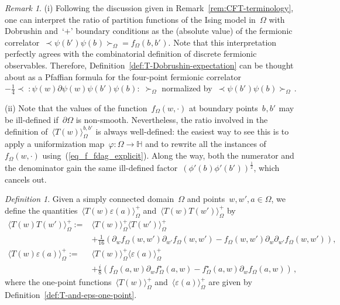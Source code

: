 \documentclass[reqno,11pt,a4paper]{amsart}
\theoremstyle{remark}
\newtheorem{definition}[proposition]{Definition}
\newtheorem{remark}[proposition]{Remark}
\renewcommand{\H}{\mathbb{H}}
\newcommand{\dob}{{b,b'}}
\newcommand{\f}{f_{\Omega}}
\newcommand{\fstar}{f_{\Omega}^\star}
\newcommand\Corr[1]{\langle #1 \rangle}
\newcommand\CorrO[2][+]{\Corr{#2}_\Omega^{#1}}
\newcommand\CorrFerm[2]{\prec\! #2 \!\succ_{#1}{}}
\begin{document}
\begin{remark} \label{rem:T-Dobrusin}
(i) Following the discussion given in Remark~\ref{rem:CFT-terminology}, one can interpret the ratio of partition functions of the Ising model in~$\Omega$ with Dobrushin and~`$+$' boundary conditions as the (absolute value) of the fermionic correlator~$\CorrFerm\Omega{\psi(b'_{})\psi(b_{})} = \f(b_{},b'_{})$. Note that this interpretation perfectly agrees with the combinatorial definition of discrete fermionic observables. Therefore, Definition~\ref{def:T-Dobrushin-expectation} can be thought about as a Pfaffian formula for the four-point fermionic correlator~$-\frac{1}{4}\CorrFerm\Omega{\;:\!\psi(w)\partial\psi(w)\psi(b'_{})\psi(b_{})\!:\;}$ normalized by~$\CorrFerm\Omega{\psi(b'_{})\psi(b_{})}$\,.

\noindent (ii) Note that the values of the function~$\f(w,\cdot)$ at boundary points~$b_{},b'_{}$ may be ill-defined if~$\partial\Omega$ is non-smooth. Nevertheless, the ratio involved in the definition of~$\CorrO[\dob]{T(w)}$ is always well-defined: the easiest way to see this is to apply a uniformization map~$\varphi:\Omega\to\H$ and to rewrite all the instances of~$\f(w,\cdot)$ using~(\ref{eq_f_fdag_explicit}). Along the way, both the numerator and the denominator gain the same ill-defined factor~$(\phi'(b_{})\phi'(b'_{}))^{\frac{1}{2}}$, which cancels out.
\end{remark}

\begin{definition}\label{def:TT-and-Te-correlations}
Given a simply connected domain~$\Omega$ and points~$w,w',a\in\Omega$, we define the quantities~$\CorrO{T(w)\varepsilon(a)}$ and~$\CorrO{T(w)T(w')}$ by
\begin{align*}
\langle T (w) T (w')\rangle^+_\Omega := & \langle T (w) \rangle^+_\Omega  \langle T(w') \rangle^+_\Omega\\
& + {\textstyle \frac{1}{16}}( \partial_w \f (w,w')\partial_{w'} \f (w,w') \!-\! \f (w,w')\partial_w \partial_{w'} \f (w,w')), \\
\langle T (w) \varepsilon (a) \rangle^+_\Omega := & \langle T (w) \rangle^+_\Omega \langle \varepsilon (a) \rangle^+_\Omega\\
& + \textstyle{\frac{i}{8}}(\f(a,w)\partial_w \fstar (a,w)
 - \fstar(a,w)\partial_w \f(a,w))\,,
\end{align*}
where %
the one-point functions~$\CorrO{T(w)}$ and~$\CorrO{\varepsilon(a)}$ are given by Definition~\ref{def:T-and-eps-one-point}.
\end{definition}
\end{document}
